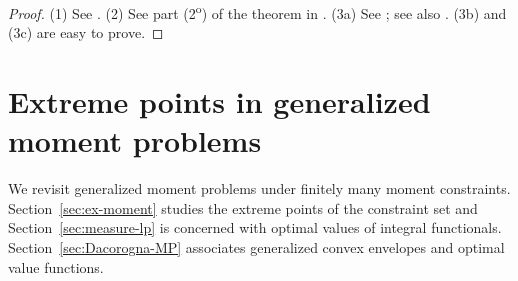 \documentclass[a4paper,11pt,reqno]{amsart}
\numberwithin{equation}{section}
\theoremstyle{plain}
\theoremstyle{definition}
\begin{document}
%
\begin{proof}
(1) See \cite[Lemma~2.3]{winkler88}.
(2) See part (2\textsuperscript{o}) of the theorem in \cite{kendall62}. 
(3a) See \cite[Lemma~3.2]{winkler2000}; see also \cite[Lemma~10.4]{phelps01}. 
(3b) and (3c) are easy to prove.
\end{proof}
%
%
\section{Extreme points in generalized moment problems}
\label{sec:problem-of-moments}
%
We revisit generalized moment problems under finitely many moment constraints.
Section~\ref{sec:ex-moment} studies the extreme points of the constraint set
and Section~\ref{sec:measure-lp} is concerned with optimal values of integral 
functionals. Section~\ref{sec:Dacorogna-MP} associates generalized convex 
envelopes and optimal value functions.
\par
%
%
\end{document}

